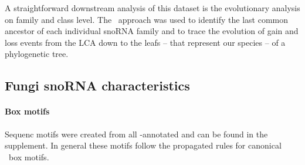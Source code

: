 %
A straightforward downstream analysis of this dataset is the evolutionary 
analysis on family and class level. The \epope\ approach was used to identify 
the last common ancestor of each individual snoRNA family and to trace the 
evolution of gain and loss events from the LCA down to the leafs -- that 
represent our species -- of a phylogenetic tree.


\subsection{Fungi snoRNA characteristics}

\paragraph{\textbf{Box motifs}} Sequenc motifs were created from all \snostrip-annotated and can be found in the supplement.
In general these motifs follow the propagated rules for canonical \sno\ box motifs.

